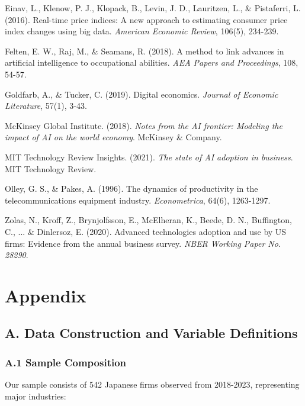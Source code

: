 \documentclass[12pt]{article}
\begin{document}
\begin{thebibliography}{99}
Einav, L., Klenow, P. J., Klopack, B., Levin, J. D., Lauritzen, L., \& Pistaferri, L. (2016). Real-time price indices: A new approach to estimating consumer price index changes using big data. \textit{American Economic Review}, 106(5), 234-239.

Felten, E. W., Raj, M., \& Seamans, R. (2018). A method to link advances in artificial intelligence to occupational abilities. \textit{AEA Papers and Proceedings}, 108, 54-57.

Goldfarb, A., \& Tucker, C. (2019). Digital economics. \textit{Journal of Economic Literature}, 57(1), 3-43.

McKinsey Global Institute. (2018). \textit{Notes from the AI frontier: Modeling the impact of AI on the world economy}. McKinsey \& Company.

MIT Technology Review Insights. (2021). \textit{The state of AI adoption in business}. MIT Technology Review.

Olley, G. S., \& Pakes, A. (1996). The dynamics of productivity in the telecommunications equipment industry. \textit{Econometrica}, 64(6), 1263-1297.

Zolas, N., Kroff, Z., Brynjolfsson, E., McElheran, K., Beede, D. N., Buffington, C., ... \& Dinlersoz, E. (2020). Advanced technologies adoption and use by US firms: Evidence from the annual business survey. \textit{NBER Working Paper No. 28290}.

\end{thebibliography}

\newpage

\section*{Appendix}

\subsection*{A. Data Construction and Variable Definitions}

\subsubsection*{A.1 Sample Composition}

Our sample consists of 542 Japanese firms observed from 2018-2023, representing major industries:
\end{document}
